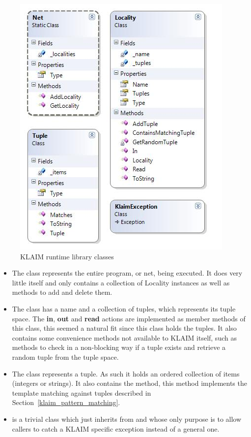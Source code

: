 	\begin{figure}[ht!]
		\centering
		\includegraphics[scale=0.8]{klaim_runtime.jpg}
		\caption{KLAIM runtime library classes}
		\label{fig:klaim_runtime}
	\end{figure}
	
	\begin{itemize}
	
	\item The  class represents the entire program, or net, being 
	executed. It does very little itself and only contains a collection of 
	\textsf{Locality} instances as well as methods to add and delete them. 
	
	\item The  class has a name and a collection of tuples, 
	which represents its tuple space. The \textbf{in}, \textbf{out} and 
	\textbf{read} actions are implemented as member methods of this class, this 
	seemed a natural fit since this class holds the tuples. It also contains 
	some convenience methods not available to KLAIM itself, such as methods to 
	check in a non-blocking way if a tuple exists and retrieve a random tuple 
	from the tuple space.

	\item The  class represents a tuple. As such it holds an 
	ordered collection of items (integers or strings). It also contains the 
	 method, this method implements the template matching 
	against tuples described in Section~\ref{klaim_pattern_matching}.
	
	\item {} is a trivial class which just inherits from 
	 and whose only purpose is to allow callers to 
	catch a KLAIM specific exception instead of a general one.
	
	\end{itemize}
	
